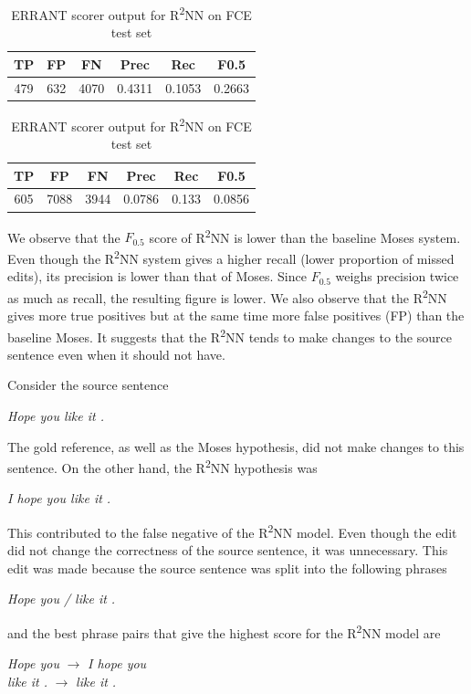 \documentclass[12pt,a4paper,twoside]{report}
\begin{document}
\begin{table}[ht]
    \centering
    \begin{tabular}{ |c|c|c|c|c|c| }
     \hline
     TP & FP & FN & Prec & Rec & F0.5 \\ [0.5ex]
     \hline
     479 & 632 & 4070 & 0.4311 & 0.1053 & 0.2663 \\
     \hline
    \end{tabular}
    \caption{ERRANT scorer output for Moses on FCE test set}
    \label{table:eval_moses}

    \vspace{1em}

    \begin{tabular}{ |c|c|c|c|c|c| }
     \hline
     TP & FP & FN & Prec & Rec & F0.5 \\ [0.5ex]
     \hline
     605 & 7088 & 3944 & 0.0786 & 0.133 & 0.0856 \\
     \hline
    \end{tabular}
    \caption{ERRANT scorer output for R\textsuperscript{2}NN on FCE test set}
    \label{table:eval_r2nn}
\end{table}

We observe that the $F_{0.5}$ score of R\textsuperscript{2}NN is lower than the baseline Moses system. Even though the R\textsuperscript{2}NN system gives a higher recall (lower proportion of missed edits), its precision is lower than that of Moses. Since $F_{0.5}$ weighs precision twice as much as recall, the resulting figure is lower. We also observe that the R\textsuperscript{2}NN gives more true positives but at the same time more false positives (FP) than the baseline Moses. It suggests that the R\textsuperscript{2}NN tends to make changes to the source sentence even when it should not have.

Consider the source sentence
\begin{center}
    \textit{Hope you like it .}
\end{center}
The gold reference, as well as the Moses hypothesis, did not make changes to this sentence. On the other hand, the R\textsuperscript{2}NN hypothesis was
\begin{center}
    \textit{I hope you like it .}
\end{center}
This contributed to the false negative of the R\textsuperscript{2}NN model. Even though the edit did not change the correctness of the source sentence, it was unnecessary. This edit was made because the source sentence was split into the following phrases
\begin{center}
    \textit{Hope you / like it .}
\end{center}
and the best phrase pairs that give the highest score for the R\textsuperscript{2}NN model are
\begin{center}
    \textit{Hope you} $\rightarrow$ \textit{I hope you}\\
    \textit{like it .} $\rightarrow$ \textit{like it .}
\end{center}
\end{document}
